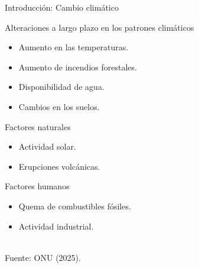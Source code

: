 \documentclass[aspectratio=169]{beamer}
\begin{document}
\begin{frame}{Introducción: Cambio climático}
    \vspace{-1.5cm}
    \begin{block}{\centering Alteraciones a largo plazo en los patrones climáticos}
       \begin{minipage}{0.5\textwidth}
			\pause\begin{itemize}
				\item Aumento en las temperaturas.
                \item Aumento de incendios forestales.
			\end{itemize}
		\end{minipage}%
		\pause\begin{minipage}{0.5\textwidth}
			\begin{itemize}
				\item Disponibilidad de agua.
                \item Cambios en los suelos.
			\end{itemize}
		\end{minipage}
    \end{block}

    \begin{minipage}{0.5\textwidth}
			\pause\begin{block}{Factores naturales}
				\begin{itemize}
					\item Actividad solar.
					\item Erupciones volcánicas.
				\end{itemize}
			\end{block}
		\end{minipage}%
		\begin{minipage}{0.5\textwidth}
			\pause\vspace{0cm}\begin{block}{Factores humanos}
				\begin{itemize}
					\item Quema de combustibles fósiles.
					\item Actividad industrial. \phantom{p}
				\end{itemize}
			\end{block}
		\end{minipage}
        \,\\
    \hfill \scriptsize Fuente: ONU (2025).
\end{frame}
\end{document}

